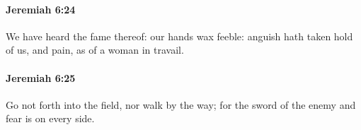 		\paragraph{Jeremiah 6:24} %
			\label{JEREMIAH-6-24}

			We have heard the fame thereof: our hands wax feeble: anguish hath taken hold of us, and pain, as of a woman in travail.


		\paragraph{Jeremiah 6:25} %
			\label{JEREMIAH-6-25}

			Go not forth into the field, nor walk by the way; for the sword of the enemy and fear is on every side.


